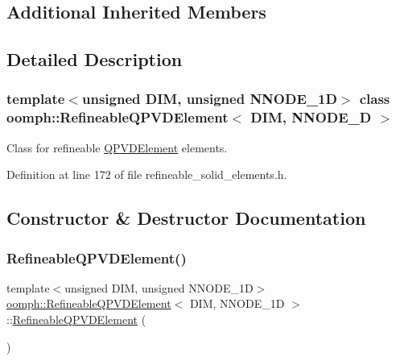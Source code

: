 \subsection*{Additional Inherited Members}


\subsection{Detailed Description}
\subsubsection*{template$<$unsigned D\+IM, unsigned N\+N\+O\+D\+E\+\_\+1D$>$\newline
class oomph\+::\+Refineable\+Q\+P\+V\+D\+Element$<$ D\+I\+M, N\+N\+O\+D\+E\+\_\+D $>$}

Class for refineable \hyperlink{classoomph_1_1QPVDElement}{Q\+P\+V\+D\+Element} elements. 

Definition at line 172 of file refineable\+\_\+solid\+\_\+elements.\+h.



\subsection{Constructor \& Destructor Documentation}
\mbox{\label{classoomph_1_1RefineableQPVDElement_a0edf55034c69aa7ae56221ee56f8a76e}} 
\subsubsection{\texorpdfstring{Refineable\+Q\+P\+V\+D\+Element()}{RefineableQPVDElement()}}
{\footnotesize\ttfamily template$<$unsigned D\+IM, unsigned N\+N\+O\+D\+E\+\_\+1D$>$ \\
\hyperlink{classoomph_1_1RefineableQPVDElement}{oomph\+::\+Refineable\+Q\+P\+V\+D\+Element}$<$ D\+IM, N\+N\+O\+D\+E\+\_\+1D $>$\+::\hyperlink{classoomph_1_1RefineableQPVDElement}{Refineable\+Q\+P\+V\+D\+Element} (\begin{DoxyParamCaption}{ }\end{DoxyParamCaption})\hspace{0.3cm}{\ttfamily [inline]}}



